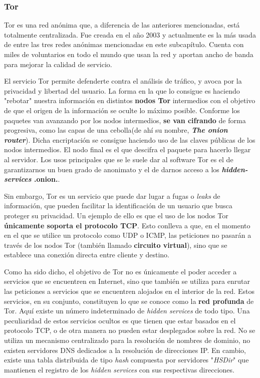 \subsubsection {Tor}
Tor es una red anónima que, a diferencia de las anteriores mencionadas, está totalmente centralizada. Fue creada en el año 2003 y actualmente es la más usada de entre las tres redes anónimas mencionadas en este subcapítulo. Cuenta con miles de voluntarios en todo el mundo que usan la red y aportan ancho de banda para mejorar la calidad de servicio.

El servicio Tor permite defenderte contra el análisis de tráfico, y avoca por la privacidad y libertad del usuario. La forma en la que lo consigue es haciendo "rebotar" nuestra información en distintos \textbf{nodos Tor} intermedios con el objetivo de que el origen de la información se oculte lo máximo posible.
Conforme los paquetes van avanzando por los nodos intermedios, \textbf{se van cifrando }de forma progresiva, como las capas de una cebolla(de ahí su nombre, \textbf{\textit{The onion router}}).
Dicha encriptación se consigue haciendo uso de las claves públicas de los nodos intermedios. El nodo final es el que descifra el paquete para hacerlo llegar al servidor.
Los usos principales que se le suele dar al software Tor es el de garantizarnos un buen grado de anonimato y el de darnos acceso a los \textbf{\textit{hidden-services} .onion.}.

Sin embargo, Tor es un servicio que puede dar lugar a fugas o \textit{leaks} de información, que pueden facilitar la identificación de un usuario que busca proteger su privacidad. Un ejemplo de ello es que el uso de los nodos Tor \textbf{únicamente soporta el protocolo TCP}. 
Esto conlleva a que, en el momento en el que se utilice un protocolo como UDP o ICMP, las peticiones no pasarán a través de los nodos Tor (también llamado \textbf{circuito virtual}), sino que se establece una conexión directa entre cliente y destino.

Como ha sido dicho, el objetivo de Tor no es únicamente el poder acceder a servicios que se encuentren en Internet, sino que también se utiliza para enrutar las peticiones a servicios que se encuentren alojados en el interior de la red. Estos servicios, en su conjunto, constituyen lo que se conoce como la \textbf{red profunda} de Tor.
Aquí existe un número indeterminado de \textit{hidden services} de todo tipo. Una peculiaridad de estos servicios ocultos es que tienen que estar basados en el protocolo TCP, o de otra manera no pueden estar desplegados sobre la red.
No se utiliza un mecanismo centralizado para la resolución de nombres de dominio, no existen servidores DNS dedicados a la resolución de direcciones IP. En cambio, existe una tabla distribuida de tipo \textit{hash} compuesta por servidores "\textit{HSDir}" que mantienen el registro de los \textit{hidden services} con sus respectivas direcciones.

